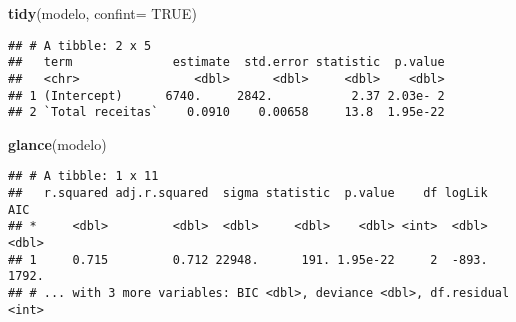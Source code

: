\documentclass[]{article}
\newenvironment{Shaded}{\begin{snugshade}}{\end{snugshade}}
\newcommand{\KeywordTok}[1]{\textcolor[rgb]{0.13,0.29,0.53}{\textbf{#1}}}
\newcommand{\DataTypeTok}[1]{\textcolor[rgb]{0.13,0.29,0.53}{#1}}
\newcommand{\DecValTok}[1]{\textcolor[rgb]{0.00,0.00,0.81}{#1}}
\newcommand{\FloatTok}[1]{\textcolor[rgb]{0.00,0.00,0.81}{#1}}
\newcommand{\StringTok}[1]{\textcolor[rgb]{0.31,0.60,0.02}{#1}}
\newcommand{\OtherTok}[1]{\textcolor[rgb]{0.56,0.35,0.01}{#1}}
\newcommand{\OperatorTok}[1]{\textcolor[rgb]{0.81,0.36,0.00}{\textbf{#1}}}
\newcommand{\NormalTok}[1]{#1}
\begin{document}
\begin{Shaded}
\begin{Highlighting}[]
  \KeywordTok{tidy}\NormalTok{(modelo, }\DataTypeTok{confint=} \OtherTok{TRUE}\NormalTok{)}
\end{Highlighting}
\end{Shaded}

\begin{verbatim}
## # A tibble: 2 x 5
##   term              estimate  std.error statistic  p.value
##   <chr>                <dbl>      <dbl>     <dbl>    <dbl>
## 1 (Intercept)      6740.     2842.           2.37 2.03e- 2
## 2 `Total receitas`    0.0910    0.00658     13.8  1.95e-22
\end{verbatim}

\begin{Shaded}
\begin{Highlighting}[]
  \KeywordTok{glance}\NormalTok{(modelo)}
\end{Highlighting}
\end{Shaded}

\begin{verbatim}
## # A tibble: 1 x 11
##   r.squared adj.r.squared  sigma statistic  p.value    df logLik   AIC
## *     <dbl>         <dbl>  <dbl>     <dbl>    <dbl> <int>  <dbl> <dbl>
## 1     0.715         0.712 22948.      191. 1.95e-22     2  -893. 1792.
## # ... with 3 more variables: BIC <dbl>, deviance <dbl>, df.residual <int>
\end{verbatim}

\begin{Shaded}
\end{Shaded}
\end{document}
